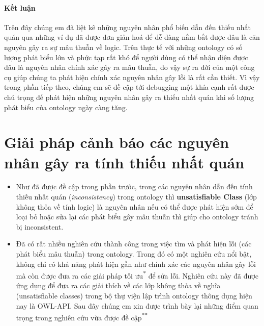 \paragraph{Kết luận}
Trên đây chúng em đã liệt kê những nguyên nhân phổ biến dẫn đến thiếu nhất quán qua những ví dụ đã được đơn giản hoá để dễ dàng nắm bắt được đâu là căn nguyên gây ra sự mâu thuẫn về logic. Trên thực tế với những ontology có số lượng phát biểu lớn và phức tạp rất khó để người dùng có thể nhận diện được đâu là nguyên nhân chính xác gây ra mâu thuẫn, do vậy sự ra đời của một công cụ giúp chúng ta phát hiện chính xác nguyên nhân gây lỗi là rất cần thiết. Vì vậy trong phần tiếp theo, chúng em sẽ đề cập tới debugging một khía cạnh rất được chú trọng đế phát hiện những nguyên nhân gây ra thiếu nhất quán khi số lượng phát biểu của ontology ngày càng tăng.

\section{Giải pháp cảnh báo các nguyên nhân gây ra tính thiếu nhất quán}
{
	\let\thefootnote\relax{}		
	\let\thefootnote\relax{}
}
\begin{itemize}
\item Như đã được đề cập trong phần trước, trong các nguyên nhân dẫn đến tính thiếu nhất quán (\textit{inconsistency}) trong ontology thì \textbf{unsatisfiable Class} (lớp không thỏa về tính logic) là nguyên nhân nếu có thể được phát hiện sớm để loại bỏ hoặc sửa lại các phát biểu gây mâu thuẫn thì giúp cho ontology tránh bị inconsistent.
\item Đã có rất nhiều nghiên cứu thành công trong việc tìm và phát hiện lỗi (các phát biểu mâu thuẫn) trong ontology. Trong đó có một nghiên cứu nổi bật\cite{repair}, không chỉ có khả năng phát hiện gần như chính xác các nguyên nhân gây lỗi mà còn được đưa ra các giải pháp tối ưu\textsuperscript{*} để sửa lỗi. Nghiên cứu này đã được ứng dụng để đưa ra các giải thích về các lớp không thỏa về nghĩa (unsatisfiable classes) trong bộ thự viện lập trình ontology thông dụng hiện nay là OWL-API\cite{owlapi}. Sau đây chúng em xin được trình bày lại những điểm quan trọng trong nghiên cứu vừa được đề cập\textsuperscript{**}
\end{itemize}

